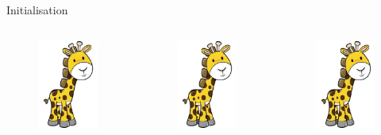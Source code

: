 \documentclass[24pt]{beamer}
\begin{document}
    \begin{frame}{Initialisation}
        \begin{columns}
                \begin{figure}
                \includegraphics[scale=0.1]{giraffe}
                \end{figure}
                \begin{figure}
                \includegraphics[scale=0.1]{giraffe}
                \end{figure}
                \begin{figure}
                \includegraphics[scale=0.1]{giraffe}

\end{figure}
\end{columns}
\end{frame}
\end{document}
